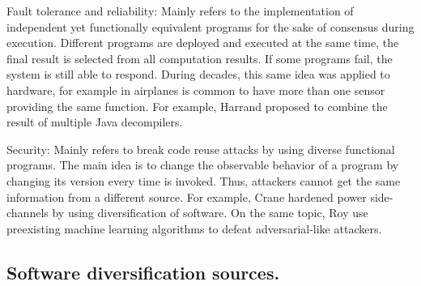 \begin{goal}{Fault tolerance and reliability:}
    \label{goal:reliability}
    \normalfont
    Mainly refers to the implementation of independent yet functionally equivalent programs for the sake of consensus during execution. Different programs are deployed and executed at the same time, the final result is selected from all computation results. If some programs fail, the system is still able to respond. During decades, this same idea was applied to hardware, for example in airplanes is common to have more than one sensor providing the same function. For example, Harrand \etal \cite{harrand2020java} proposed to combine the result of multiple Java decompilers.
\end{goal}

\begin{goal}{Security:}
    \label{goal:security}    
    \normalfont
    Mainly refers to break code reuse attacks \cite{595185} by using diverse functional programs. The main idea is to change the observable behavior of a program by changing its version every time is invoked. Thus, attackers cannot get the same information from a different source. For example, Crane \etal \cite{crane2015thwarting} hardened power side-channels by using diversification of software. On the same topic, Roy \etal \cite{10.1145/3318216.3363338} use preexisting machine learning algorithms to defeat adversarial-like attackers.
\end{goal} 







\subsection*{Software diversification sources.}

